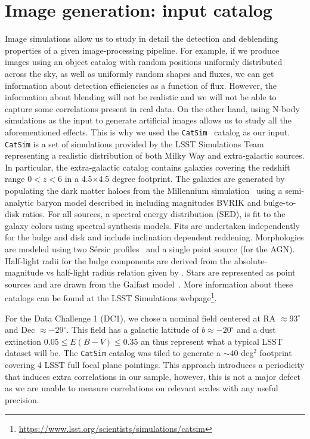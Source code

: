 \documentclass[twocolumn]{aastex62}
\begin{document}
\section{Image generation: input catalog}
\label{sec:inputs}
Image simulations allow us to study in detail the detection and deblending properties of a given image-processing pipeline. For example, if we produce images using an object catalog with random positions uniformly distributed across the sky, as well as uniformly random shapes and fluxes, we can get information about detection efficiencies as a function of flux.  However, the information about blending will not be realistic and we will not be able to capture some correlations present in real data. On the other hand, using N-body simulations as the input to generate artificial images allows us to study all the aforementioned effects. This is why we used the \texttt{CatSim}~\citep{2010SPIE.7738E..1OC,2014SPIE.9150E..14C} catalog as our input.  \texttt{CatSim} is a set of simulations provided by the LSST Simulations Team representing a realistic distribution of both Milky Way and extra-galactic sources. In particular, the extra-galactic catalog contains galaxies covering the redshift range $0 < z < 6$ in a 4.5$\times$4.5 degree footprint. The galaxies are generated by populating the dark matter haloes from the Millennium simulation~\citep{2005Nature.435.629S} using a semi-analytic baryon model described in \citet{2006MNRAS.366..499D} including magnitudes BVRIK and bulge-to-disk ratios. For all sources, a spectral energy distribution (SED), is fit to the galaxy colors using \citet{2003MNRAS.344.1000B} spectral synthesis models. Fits are undertaken independently for the bulge and disk and include inclination dependent reddening. Morphologies are modeled using two S\'{e}rsic profiles~\citep{1963BAAA....6...41S} and a single point source (for the AGN). Half-light radii for the bulge components are derived from the absolute-magnitude vs half-light radius relation given by \citet{2011A&A...534A...3G}. Stars are represented as point sources and are drawn from the Galfast model~\citep{2008ApJ...673..864J}. More information about these catalogs can be found at the LSST Simulations webpage\footnote{\url{https://www.lsst.org/scientists/simulations/catsim}}.

For the Data Challenge 1 (DC1), we chose a nominal field centered at RA $\approx 93^{\circ}$ and Dec $\approx -29^{\circ}$. This field has a galactic latitude of $b \approx -20^{\circ}$ and a dust extinction $0.05 \leq E(B-V) \leq 0.35$ an thus represent what a typical LSST dataset will be. The \texttt{CatSim} catalog was tiled to generate a $\sim 40$ deg$^{2}$ footprint covering 4 LSST full focal plane pointings. This approach introduces a periodicity that induces extra correlations in our sample, however, this is not a major defect as we are unable to measure correlations on relevant scales with any useful precision.
\end{document}
